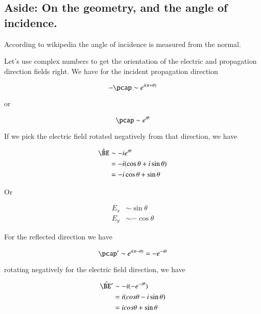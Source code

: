 \subsection{Aside: On the geometry, and the angle of incidence.}

According to wikipedia \citep{wiki:angleOfIncidence} the angle of incidence is measured from the normal.

Let's use complex numbers to get the orientation of the electric and propagation direction fields right.  We have for the incident propagation direction

\begin{equation}\label{eqn:relativisticElectrodynamicsT9:520}
-\pcap \sim e^{i (\pi + \theta) }
\end{equation}

or

\begin{equation}\label{eqn:relativisticElectrodynamicsT9:540}
\pcap \sim e^{i\theta}
\end{equation}

If we pick the electric field rotated negatively from that direction, we have

\begin{align*}
\hat{\BE} 
&\sim -i e^{i \theta} \\
&= -i (\cos\theta + i \sin\theta) \\
&= -i \cos\theta + \sin\theta
\end{align*}

Or

\begin{align}\label{eqn:relativisticElectrodynamicsT9:560}
E_x &\sim \sin\theta \\
E_y &\sim -\cos\theta
\end{align}

For the reflected direction we have

\begin{equation}\label{eqn:relativisticElectrodynamicsT9:580}
\pcap' \sim e^{i (\pi - \theta)} = - e^{-i \theta}
\end{equation}

rotating negatively for the electric field direction, we have

\begin{align*}
\hat{\BE'} 
&\sim -i (- e^{-i\theta} ) \\
&= i(cos\theta - i\sin\theta) \\
&= i cos\theta + \sin\theta
\end{align*}

